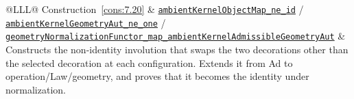 \begin{xltabular}{\linewidth}{@{}LLL@{}}
Construction~\ref{cons:7.20} & \href{https://github.com/iroha1203/AlgebraicArchitectureTheoryV2/blob/719f81f47d410701fd82c2bc88613cc140c59377/research/lean/ResearchLean/AG/FullGeometryNormalization/AmbientKernelObjectSwap.lean\#L183}{\texttt{ambient\allowbreak{}Kernel\allowbreak{}Object\allowbreak{}Map\_\allowbreak{}ne\_\allowbreak{}id}} / \href{https://github.com/iroha1203/AlgebraicArchitectureTheoryV2/blob/719f81f47d410701fd82c2bc88613cc140c59377/research/lean/ResearchLean/AG/FullGeometryNormalization/AmbientKernelGeometryLift.lean\#L151}{\texttt{ambient\allowbreak{}Kernel\allowbreak{}Geometry\allowbreak{}Aut\_\allowbreak{}ne\_\allowbreak{}one}} / \href{https://github.com/iroha1203/AlgebraicArchitectureTheoryV2/blob/719f81f47d410701fd82c2bc88613cc140c59377/research/lean/ResearchLean/AG/FullGeometryNormalization/AmbientKernelGeometryLift.lean\#L185}{\texttt{geometry\allowbreak{}Normalization\allowbreak{}Functor\_\allowbreak{}map\_\allowbreak{}ambient\allowbreak{}Kernel\allowbreak{}Admissible\allowbreak{}Geometry\allowbreak{}Aut}} & Constructs the non-identity involution that swaps the two decorations other than the selected decoration at each configuration. Extends it from Ad to operation/Law/geometry, and proves that it becomes the identity under normalization. \\
\addlinespace[3pt]

\end{xltabular}
